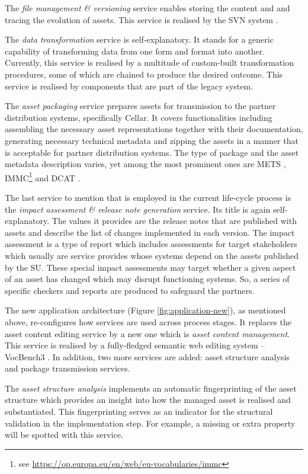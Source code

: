 	The \textit{file management \& versioning} service enables storing the content and and tracing the evolution of assets. This service is realised by the SVN system \cite{svn}.
	
	The \textit{data transformation} service is self-explanatory. It stands for a generic capability of transforming data from one form and format into another. Currently, this service is realised by a multitude of custom-built transformation procedures, some of which are chained to produce the desired outcome. This service is realised by components that are part of the legacy system. 
	
	The \textit{asset packaging} service prepares assets for transmission to the partner distribution systems, specifically Cellar. It covers functionalities including assembling the necessary asset representations together with their documentation, generating necessary technical metadata and zipping the assets in a manner that is acceptable for partner distribution systems. The type of package and the asset metadata description varies, yet among the most prominent ones are METS \citep{mets}, IMMC\footnote{see \url{https://op.europa.eu/en/web/eu-vocabularies/immc}} and DCAT \cite{dcat2}. 
	
	The last service to mention that is employed in the current life-cycle process is the \textit{impact assessment \& release note generation} service. Its title is again self-explanatory. The values it provides are the release notes that are published with assets and describe the list of changes implemented in each version. The impact assessment is a type of report which includes assessments for target stakeholders which usually are service provides whose systems depend on the assets published by the SU. These special impact assessments may target whether a given aspect of an asset has changed which may disrupt functioning systems. So, a series of specific checkers and reports are produced to safeguard the partners. 
	
	The new application architecture (Figure \ref{fig:application-new}), as mentioned above, re-configures how services are used across process stages. It replaces the asset content editing service by a new one which is \textit{asset content management}. This service is realised by a fully-fledged semantic web editing system -- VocBench3 \citep{stellatovocbench}. In addition, two more services are added: asset structure analysis and package transmission services.
	
	The \textit{asset structure analysis} implements an automatic fingerprinting of the asset structure which provides an insight into how the managed asset is realised and substantiated. This fingerprinting serves as an indicator for the structural validation in the implementation step. For example, a missing or extra property will be spotted with this service. 
	

